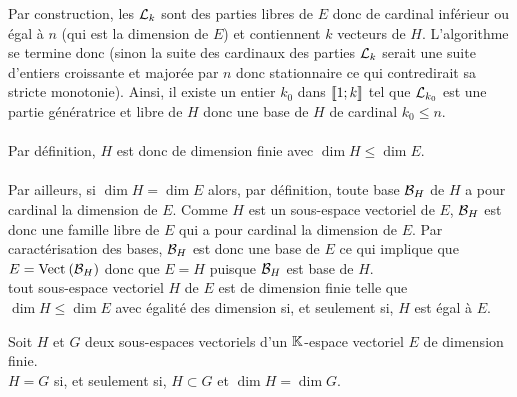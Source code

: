 \begin{dem}
\begin{itemize}
\begin{itemize}
            Par construction, les \(\cal{L}_k\) sont des parties libres de \(E\) donc de cardinal inférieur ou égal à \(n\) (qui est la dimension de \(E\)) et contiennent \(k\) vecteurs de \(H\). L’algorithme se termine donc (sinon la suite des cardinaux des parties \(\cal{L}_k\) serait une suite d’entiers croissante et majorée par \(n\) donc stationnaire ce qui contredirait sa stricte monotonie). Ainsi, il existe un entier \(k_0\) dans \(\interventierii{1}{k}\) tel que \(\cal{L}_{k_0}\) est une partie génératrice et libre de \(H\) donc une base de \(H\) de cardinal \(k_0 \leq n\).\\~\\
            Par définition, \(H\) est donc de dimension finie avec \(\dim H \leq \dim E\).\\~\\
            Par ailleurs, si \(\dim H = \dim E\) alors, par définition, toute base \(\cal{B}_H\) de \(H\) a pour cardinal la dimension de \(E\). Comme \(H\) est un sous-espace vectoriel de \(E\), \(\cal{B}_H\) est donc une famille libre de \(E\) qui a pour cardinal la dimension de \(E\). Par caractérisation des bases, \(\cal{B}_H\) est donc une base de \(E\) ce qui implique que \(E = \Vect{\cal{B}_H}\) donc que \(E = H\) puisque \(\cal{B}_H\) est base de \(H\).\\
            \conclusion tout sous-espace vectoriel \(H\) de \(E\) est de dimension finie telle que \(\dim H \leq \dim E\) avec égalité des dimension si, et seulement si, \(H\) est égal à \(E\).
        \end{itemize}
    \end{itemize}
\end{dem}

\begin{defprop}
    Soit \(H\) et \(G\) deux sous-espaces vectoriels d’un \(\K\)-espace vectoriel \(E\) de dimension finie.\\
   \( H = G\) si, et seulement si, \(H \subset G\) et \(\dim H = \dim G\).
\end{defprop}

